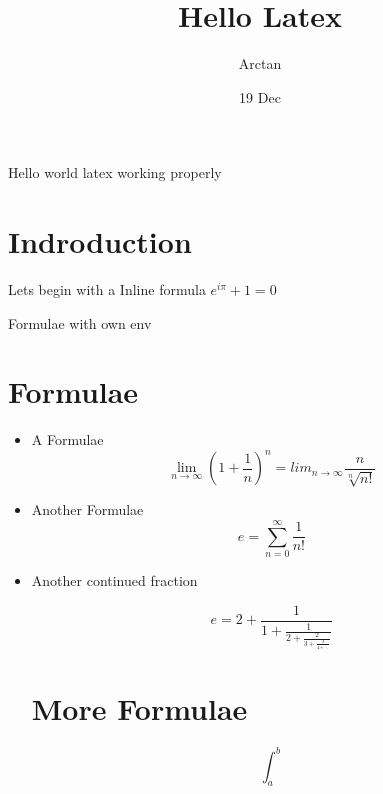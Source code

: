\documentclass{article}
\title{Hello Latex}
\author{Arctan}
\date{19 Dec}
\begin{document}
    \maketitle
    Hello world  latex working properly
    \section{Indroduction}

    Lets begin with a Inline formula $e^{i\pi} + 1 =0$

Formulae with own env
    \section*{Formulae}
    \begin{itemize}  %
   \item A Formulae
     $$ \lim_{n\to\infty} \left(1+\frac{1}{n}\right)^n = lim_{n\to\infty}\frac{n}{\sqrt[n]{n!}} $$

   \item Another Formulae
     $$e = \sum_{n=0}^{\infty}\frac{1}{n!}$$
    
  \item  Another continued fraction

     $$e = 2+\frac{1}{1+\frac{1}{2+\frac{2}{3+\frac{3}{4+\ddots}}}}$$

     \section{More Formulae}

     $$ \int_a^b $$


\end{itemize}
\end{document}
